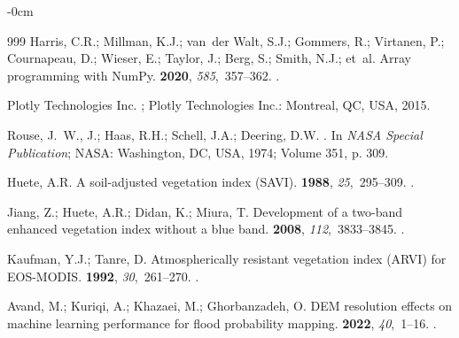 \documentclass[jimaging,article,accept,pdftex,moreauthors]{Definitions/mdpi}
\begin{document}
\begin{adjustwidth}{-\extralength}{0cm}
\begin{thebibliography}{999}
Harris, C.R.; Millman, K.J.; van~der Walt, S.J.; Gommers, R.; Virtanen, P.;
  Cournapeau, D.; Wieser, E.; Taylor, J.; Berg, S.; Smith, N.J.;  et~al.
\newblock Array programming with {NumPy}.
 {\bf 2020}, {\em 585},~357--362.
.

Plotly Technologies Inc.
; Plotly Technologies Inc.: Montreal, QC, USA, 2015.

{Rouse}, J.~W., J.; {Haas}, R.H.; {Schell}, J.A.; {Deering}, D.W.
. In
  {\em NASA Special Publication}; NASA: Washington, DC, USA, 1974; Volume 351, p. 309.

Huete, A.R.
\newblock A soil-adjusted vegetation index (SAVI).
 {\bf 1988}, {\em 25},~295--309.
.

Jiang, Z.; Huete, A.R.; Didan, K.; Miura, T.
\newblock Development of a two-band enhanced vegetation index without a blue
  band.
 {\bf 2008}, {\em
  112},~3833--3845.
.

Kaufman, Y.J.; Tanre, D.
\newblock Atmospherically resistant vegetation index (ARVI) for EOS-MODIS.
 {\bf 1992},
  {\em 30},~261--270.
.

Avand, M.; Kuriqi, A.; Khazaei, M.; Ghorbanzadeh, O.
\newblock DEM resolution effects on machine learning performance for flood
  probability mapping.
 {\bf 2022}, {\em
  40},~1--16.
.

\end{thebibliography}


\end{adjustwidth}
\end{document}
